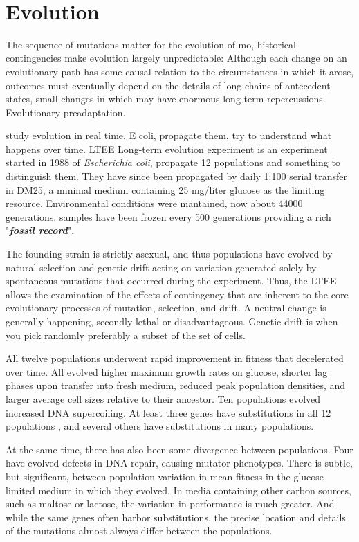 \

\section{Evolution}
The sequence of mutations matter for the evolution of mo, historical contingencies make evolution largely unpredictable: Although each change on an evolutionary path has some causal relation to the circumstances in which it arose, outcomes must eventually
depend on the details of long chains of antecedent states, small changes in which may have enormous long-term repercussions. Evolutionary preadaptation.

study evolution in real time. E coli, propagate them, try to understand what happens over time. LTEE Long-term evolution experiment is an experiment started in 1988 of \textit{Escherichia coli}, propagate 12 populations and something to distinguish them. They have since been propagated by daily 1:100 serial transfer in DM25, a minimal medium containing 25 mg/liter
glucose as the limiting resource.
Environmental conditions were mantained, now about 44000 generations. samples have been frozen every 500 generations  providing a rich "\textbf{\textit{fossil
record}}".

The founding strain is strictly asexual, and thus populations have evolved by natural selection and genetic drift acting on variation generated solely by spontaneous mutations that occurred during the experiment. Thus, the LTEE
allows the examination of the effects of contingency that are inherent to the core evolutionary processes of mutation, selection, and drift. A neutral change is generally happening, secondly lethal or disadvantageous. Genetic drift is when you pick randomly preferably a subset of the set of cells. 

All twelve populations underwent rapid improvement in fitness that
decelerated over time. All evolved higher maximum growth rates on glucose, shorter lag phases upon
transfer into fresh medium, reduced peak population densities, and larger
average cell sizes relative to their ancestor. Ten populations evolved increased DNA supercoiling. At least three genes have substitutions in all 12 populations , and several
others have substitutions in many populations.

At the same time, there has also been some divergence between populations.
Four have evolved defects in DNA repair, causing mutator phenotypes.
There is subtle, but significant, between population variation in mean fitness
in the glucose-limited medium in which they evolved.
In media containing other carbon sources, such as maltose or lactose, the
variation in performance is much greater. And while the same genes often
harbor substitutions, the precise location and details of the mutations almost
always differ between the populations.

